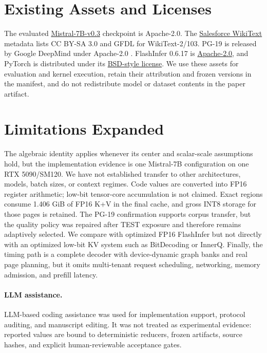 \section{Existing Assets and Licenses}

The evaluated \href{https://huggingface.co/mistralai/Mistral-7B-v0.3}
{Mistral-7B-v0.3} checkpoint is Apache-2.0. The
\href{https://huggingface.co/datasets/Salesforce/wikitext}{Salesforce WikiText}
metadata lists CC BY-SA 3.0 and GFDL for WikiText-2/103. PG-19 is released by
Google DeepMind under Apache-2.0 \citep{rae2019compressive}. FlashInfer 0.6.17 is
\href{https://github.com/flashinfer-ai/flashinfer}{Apache-2.0}, and PyTorch is
distributed under its \href{https://github.com/pytorch/pytorch/blob/main/LICENSE}
{BSD-style license}. We use these assets for evaluation and kernel execution,
retain their attribution and frozen versions in the manifest, and do not
redistribute model or dataset contents in the paper artifact.

\section{Limitations Expanded}

The algebraic identity applies whenever its center and scalar-scale assumptions
hold, but the implementation evidence is one Mistral-7B configuration on one
RTX 5090/SM120. We have not established transfer to other architectures,
models, batch sizes, or context regimes. Code values are converted into FP16
register arithmetic; low-bit tensor-core accumulation is not claimed. Exact
regions consume 1.406 GiB of FP16 K+V in the final cache, and gross INT8 storage
for those pages is retained. The PG-19 confirmation supports corpus transfer,
but the quality policy was repaired after TEST exposure and therefore remains
adaptively selected. We compare with optimized FP16 FlashInfer but not directly
with an optimized low-bit KV system such as BitDecoding or InnerQ. Finally, the timing path is a complete decoder with
device-dynamic graph banks and real page planning, but it omits multi-tenant
request scheduling, networking, memory admission, and prefill latency.

\paragraph{LLM assistance.}
LLM-based coding assistance was used for implementation support, protocol
auditing, and manuscript editing. It was not treated as experimental evidence:
reported values are bound to deterministic reducers, frozen artifacts, source
hashes, and explicit human-reviewable acceptance gates.
